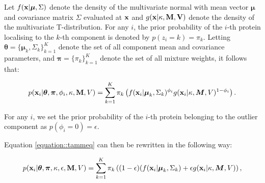 \documentclass[12pt,english]{article}
\begin{document}
Let  $f({\bf x} | \boldsymbol{\mu}, \Sigma)$ denote the density of
the multivariate normal with mean vector $\boldsymbol{\mu}$ and
covariance matrix $\Sigma$ evaluated at ${\bf x}$ and $g({\bf x | \kappa, \bf{M}, V} )$ denote the density of the multivariate T-distribution. For any $i$, the prior probability of the $i$-th protein localising to the $k$-th component is denoted by $p(z_i = k) = \pi_k$. Letting
$\boldsymbol{\theta} = \{\boldsymbol{\mu}_k, \Sigma_k \}_{k = 1}^K$
denote the set of all component mean and covariance parameters, and
$\boldsymbol{\pi} = \{\pi_k\}_{k = 1}^K$ denote the set of all mixture
weights, it follows that:

\begin{equation} \label{equation::tammeq}
\begin{split}
p({\bf x}_i| \boldsymbol{\theta}, \boldsymbol{\pi} ,\phi_i, \kappa, {\bf M}, V) &=  \sum_{k=1}^{K}\pi_k\left(f({\bf x}_i|\boldsymbol{\mu}_k, \Sigma_k)^{\phi_i}g({\bf x}_i|\kappa, \boldsymbol{M}, V)^{1 - \phi_i }\right).\\
\end{split}
\end{equation}

For any $i$, we set the prior probability of the $i$-th protein
belonging to the outlier component as $p(\phi_i = 0) = \epsilon$.

Equation \eqref{equation::tammeq}  can then be rewritten in the following way:

\begin{equation}\label{equation::tammepseq}
\begin{split}
p({\bf x}_i| \boldsymbol{\theta}, \boldsymbol{\pi} , \kappa, \epsilon, {\bf M}, V) &=  \sum_{k=1}^{K}\pi_k\left((1-\epsilon)(f({\bf x}_i |\boldsymbol{\mu}_k, \Sigma_k) + \epsilon g({\bf x}_i|\kappa, \boldsymbol{M}, V)\right),\\
\end{split}
\end{equation}
\end{document}
